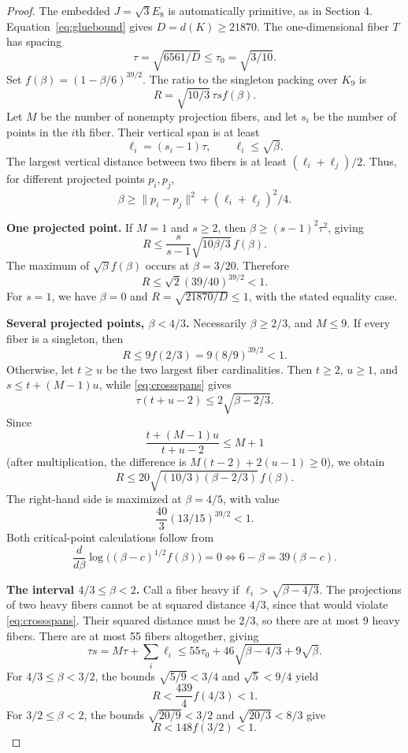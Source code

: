 \documentclass[11pt,a4paper]{article}
\theoremstyle{remark}\newtheorem{remark}[theorem]{Remark}
\begin{document}
\begin{proof}
The embedded $J=\sqrt3E_8$ is automatically primitive, as in Section 4. Equation~\eqref{eq:gluebound} gives $D=d(K)\ge21870$. The one-dimensional fiber $T$ has spacing
\[
\tau=\sqrt{6561/D}\le\tau_0=\sqrt{3/10}.
\]
Set $f(\beta)=(1-\beta/6)^{39/2}$. The ratio to the singleton packing over $K_9$ is
\begin{equation}\label{eq:familyratio}
R=\sqrt{10/3}\,\tau s f(\beta).
\end{equation}
Let $M$ be the number of nonempty projection fibers, and let $s_i$ be the number of points in the $i$th fiber. Their vertical span is at least
\[
\ell_i=(s_i-1)\tau,\qquad \ell_i\le\sqrt\beta.
\]
The largest vertical distance between two fibers is at least $(\ell_i+\ell_j)/2$. Thus, for different projected points $p_i,p_j$,
\begin{equation}\label{eq:crossspans}
\beta\ge\|p_i-p_j\|^2+(\ell_i+\ell_j)^2/4.
\end{equation}

\textbf{One projected point.} If $M=1$ and $s\ge2$, then $\beta\ge(s-1)^2\tau^2$, giving
\[
R\le\frac{s}{s-1}\sqrt{10\beta/3}\,f(\beta).
\]
The maximum of $\sqrt\beta f(\beta)$ occurs at $\beta=3/20$. Therefore
\[
R\le\sqrt2(39/40)^{39/2}<1.
\]
For $s=1$, we have $\beta=0$ and $R=\sqrt{21870/D}\le1$, with the stated equality case.

\textbf{Several projected points, $\beta<4/3$.} Necessarily $\beta\ge2/3$, and $M\le9$. If every fiber is a singleton, then
\[
R\le9f(2/3)=9(8/9)^{39/2}<1.
\]
Otherwise, let $t\ge u$ be the two largest fiber cardinalities. Then $t\ge2$, $u\ge1$, and $s\le t+(M-1)u$, while \eqref{eq:crossspans} gives
\[
\tau(t+u-2)\le2\sqrt{\beta-2/3}.
\]
Since
\[
\frac{t+(M-1)u}{t+u-2}\le M+1
\]
(after multiplication, the difference is $M(t-2)+2(u-1)\ge0$), we obtain
\[
R\le20\sqrt{(10/3)(\beta-2/3)}\,f(\beta).
\]
The right-hand side is maximized at $\beta=4/5$, with value
\[
\frac{40}{3}(13/15)^{39/2}<1.
\]
Both critical-point calculations follow from
\[
\frac{d}{d\beta}\log\big((\beta-c)^{1/2}f(\beta)\big)=0
\Longleftrightarrow 6-\beta=39(\beta-c).
\]

\textbf{The interval $4/3\le\beta<2$.} Call a fiber heavy if $\ell_i>\sqrt{\beta-4/3}$. The projections of two heavy fibers cannot be at squared distance $4/3$, since that would violate \eqref{eq:crossspans}. Their squared distance must be $2/3$, so there are at most 9 heavy fibers. There are at most 55 fibers altogether, giving
\[
\tau s=M\tau+\sum_i\ell_i
\le55\tau_0+46\sqrt{\beta-4/3}+9\sqrt\beta.
\]
For $4/3\le\beta<3/2$, the bounds $\sqrt{5/9}<3/4$ and $\sqrt5<9/4$ yield
\[
R<\frac{439}{4}f(4/3)<1.
\]
For $3/2\le\beta<2$, the bounds $\sqrt{20/9}<3/2$ and $\sqrt{20/3}<8/3$ give
\[
R<148f(3/2)<1.
\]


\end{proof}
\end{document}

